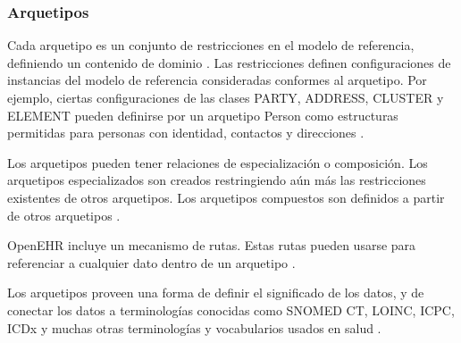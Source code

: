 \subsubsection{Arquetipos}

Cada arquetipo es un conjunto de restricciones en el modelo de referencia, definiendo un contenido de dominio \cite{openEHRArchitecture}. Las restricciones definen configuraciones de instancias del modelo de referencia consideradas conformes al arquetipo. Por ejemplo, ciertas configuraciones de las clases PARTY, ADDRESS, CLUSTER y ELEMENT pueden definirse por un arquetipo Person como estructuras permitidas para personas con identidad, contactos y direcciones \cite{openEHRAOM}.

Los arquetipos pueden tener relaciones de especialización o composición. Los arquetipos especializados son creados restringiendo aún más las restricciones existentes de otros arquetipos. Los arquetipos compuestos son definidos a partir de otros arquetipos \cite{openEHRArchitecture}.

OpenEHR incluye un mecanismo de rutas. Estas rutas pueden usarse para referenciar a cualquier dato dentro de un arquetipo \cite{openEHRArchitecture}.

Los arquetipos proveen una forma de definir el significado de los datos, y de conectar los datos a terminologías conocidas como SNOMED CT, LOINC, ICPC, ICDx y muchas otras terminologías y vocabularios usados en salud \cite{openEHRArchitecture}.

